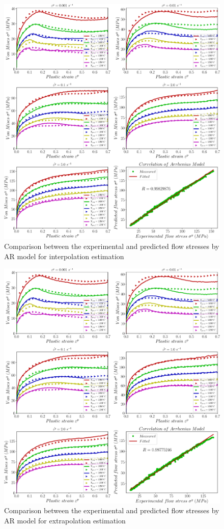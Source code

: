 \documentclass[twoside,english,1p,final,sort&compress]{elsarticle}
\theoremstyle{plain}
\begin{document}
\begin{figure}[!ht]
\centering
\includegraphics[width=1.02\columnwidth]
{newFigures/iCorrelationAR}
\caption{Comparison between the experimental and predicted flow stresses by AR model for interpolation estimation}
\label{fig:iCorrelationAR}
\end{figure}
\begin{figure}[!ht]
\centering
\includegraphics[width=1.02\columnwidth]
{newFigures/eCorrelationAR}
\caption{Comparison between the experimental and predicted flow stresses by AR model for extrapolation estimation}
\label{fig:eCorrelationAR}
\end{figure}
\FloatBarrier
\end{document}
